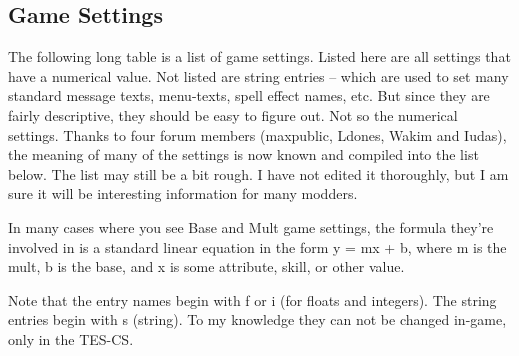 \documentclass[
]{article}
\begin{document}
\hypertarget{game-settings}{%
\subsection{\texorpdfstring{\hfill\break
Game Settings}{ Game Settings}}\label{game-settings}}

The following long table is a list of game settings. Listed here are all
settings that have a numerical value. Not listed are string entries --
which are used to set many standard message texts, menu-texts, spell
effect names, etc. But since they are fairly descriptive, they should be
easy to figure out. Not so the numerical settings. Thanks to four forum
members (maxpublic, Ldones, Wakim and Iudas), the meaning of many of the
settings is now known and compiled into the list below. The list may
still be a bit rough. I have not edited it thoroughly, but I am sure it
will be interesting information for many modders.

In many cases where you see Base and Mult game settings, the formula
they're involved in is a standard linear equation in the form y = mx +
b, where m is the mult, b is the base, and x is some attribute, skill,
or other value.

Note that the entry names begin with f or i (for floats and integers).
The string entries begin with s (string). To my knowledge they can not
be changed in-game, only in the TES-CS.
\end{document}

